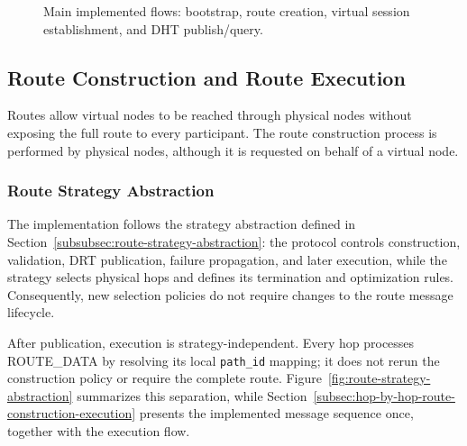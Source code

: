 \documentclass[12pt]{article}
\newcommand{\codebreak}[1]{{\footnotesize\ttfamily #1}}
\begin{document}
\begin{figure}[H]
{
}
\caption{Main implemented flows: bootstrap, route creation, virtual session establishment, and DHT publish/query.}
\label{fig:implementation-flow}
\end{figure}

\subsection{Route Construction and Route Execution}
\label{sec:route-construction-execution}

Routes allow virtual nodes to be reached through physical nodes without exposing the full route to every participant. The route construction process is performed by physical nodes, although it is requested on behalf of a virtual node.

\subsubsection{Route Strategy Abstraction}
\label{subsec:route-strategy-abstraction}

The implementation follows the strategy abstraction defined in Section~\ref{subsubsec:route-strategy-abstraction}: the protocol controls construction, validation, DRT publication, failure propagation, and later execution, while the strategy selects physical hops and defines its termination and optimization rules. Consequently, new selection policies do not require changes to the route message lifecycle.

After publication, execution is strategy-independent. Every hop processes \codebreak{ROUTE\_\allowbreak{}DATA} by resolving its local \texttt{path\_id} mapping; it does not rerun the construction policy or require the complete route. Figure~\ref{fig:route-strategy-abstraction} summarizes this separation, while Section~\ref{subsec:hop-by-hop-route-construction-execution} presents the implemented message sequence once, together with the execution flow.
\end{document}
